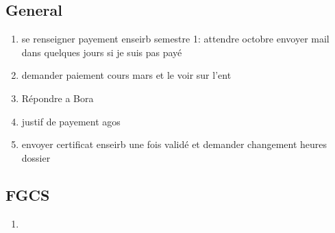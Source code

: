 \documentclass[a4paper]{article}
\begin{document}
	\subsection{General}
		\begin{enumerate}
			\item se renseigner payement enseirb semestre 1: attendre octobre envoyer mail dans quelques jours si je suis pas payé
			\item demander paiement cours mars et le voir sur l'ent
			\item Répondre a Bora
			\item justif de payement agos
			\item envoyer certificat enseirb une fois validé et demander changement heures dossier
		\end{enumerate}
	\subsection{FGCS}
		\begin{enumerate}
			\item
		\end{enumerate}
\end{document}
